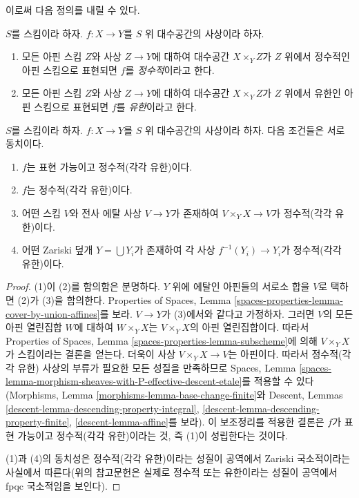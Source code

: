 \noindent
이로써 다음 정의를 내릴 수 있다.

\begin{definition}
\label{definition-integral}
$S$를 스킴이라 하자.
$f : X \to Y$를 $S$ 위 대수공간의 사상이라 하자.
\begin{enumerate}
\item 모든 아핀 스킴 $Z$와 사상 $Z \to Y$에 대하여 대수공간
$X \times_Y Z$가 $Z$ 위에서 정수적인 아핀 스킴으로 표현되면 $f$를
{\it 정수적}이라고 한다.
\item 모든 아핀 스킴 $Z$와 사상 $Z \to Y$에 대하여 대수공간
$X \times_Y Z$가 $Z$ 위에서 유한인 아핀 스킴으로 표현되면 $f$를
{\it 유한}이라고 한다.
\end{enumerate}
\end{definition}

\begin{lemma}
\label{lemma-integral-local}
$S$를 스킴이라 하자.
$f : X \to Y$를 $S$ 위 대수공간의 사상이라 하자.
다음 조건들은 서로 동치이다.
\begin{enumerate}
\item $f$는 표현 가능이고 정수적(각각 유한)이다.
\item $f$는 정수적(각각 유한)이다.
\item 어떤 스킴 $V$와 전사 에탈 사상 $V \to Y$가 존재하여
$V \times_Y X \to V$가 정수적(각각 유한)이다.
\item 어떤 Zariski 덮개 $Y = \bigcup Y_i$가 존재하여 각 사상
$f^{-1}(Y_i) \to Y_i$가 정수적(각각 유한)이다.
\end{enumerate}
\end{lemma}

\begin{proof}
(1)이 (2)를 함의함은 분명하다. $Y$ 위에 에탈인 아핀들의 서로소 합을
$V$로 택하면 (2)가 (3)을 함의한다. Properties of Spaces, Lemma
\ref{spaces-properties-lemma-cover-by-union-affines}를 보라.
$V \to Y$가 (3)에서와 같다고 가정하자. 그러면 $V$의 모든 아핀 열린집합
$W$에 대하여 $W \times_Y X$는 $V \times_Y X$의 아핀 열린집합이다.
따라서 Properties of Spaces, Lemma
\ref{spaces-properties-lemma-subscheme}에 의해 $V \times_Y X$가 스킴이라는
결론을 얻는다. 더욱이 사상 $V \times_Y X \to V$는 아핀이다. 따라서
정수적(각각 유한) 사상의 부류가 필요한 모든 성질을 만족하므로 Spaces,
Lemma \ref{spaces-lemma-morphism-sheaves-with-P-effective-descent-etale}를
적용할 수 있다(Morphisms, Lemma
\ref{morphisms-lemma-base-change-finite}와 Descent, Lemmas
\ref{descent-lemma-descending-property-integral},
\ref{descent-lemma-descending-property-finite},
\ref{descent-lemma-affine}를 보라). 이 보조정리를 적용한 결론은 $f$가
표현 가능이고 정수적(각각 유한)이라는 것, 즉 (1)이 성립한다는 것이다.

\medskip\noindent
(1)과 (4)의 동치성은 정수적(각각 유한)이라는 성질이 공역에서 Zariski
국소적이라는 사실에서 따른다(위의 참고문헌은 실제로 정수적 또는
유한이라는 성질이 공역에서 fpqc 국소적임을 보인다).
\end{proof}

